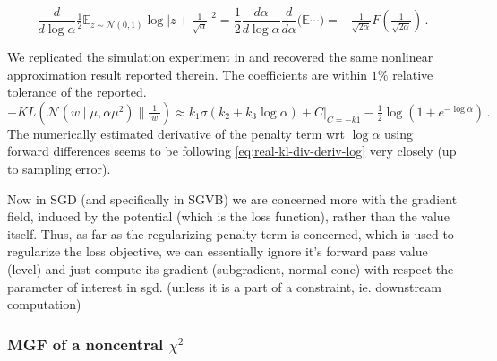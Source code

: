 \documentclass[a4paper,10pt]{article}
\begin{document}
\begin{equation} \label{eq:real-kl-div-deriv-log}
\frac{d}{d\log \alpha}
  \tfrac12 \mathbb{E}_{z \sim \mathcal{N}(0,1)}
  \log \lvert z + \tfrac1{\sqrt{\alpha}} \rvert^2
  = \frac12 \frac{d\alpha}{d\log \alpha}
    \frac{d}{d\alpha} \bigl(\mathbb{E}\cdots \bigr)
  = - \tfrac1{\sqrt{2\alpha}} F(\tfrac1{\sqrt{2\alpha}})
  \,.
\end{equation}

We replicated the simulation experiment in \cite{molchanov_variational_2017} and recovered
the same nonlinear approximation result reported therein. The coefficients are within
$1\%$ relative tolerance of the reported.
$$
- KL(\mathcal{N}(w \mid \mu, \alpha \mu^2) \|
    \tfrac1{\lvert w \rvert})
  \approx
    k_1 \sigma(k_2 + k_3 \log \alpha) + C \big\vert_{C = -k1}
    - \tfrac12 \log (1 + e^{-\log \alpha})
  \,. $$
The numerically estimated derivative of the penalty term wrt $\log \alpha$ using forward
differences seems to be following \eqref{eq:real-kl-div-deriv-log} very closely (up to
sampling error).

Now in SGD (and specifically in SGVB) we are concerned more with the gradient field, induced
by the potential (which is the loss function), rather than the value itself. Thus, as far as
the regularizing penalty term is concerned, which is used to regularize the loss objective,
we can essentially ignore it's forward pass value (level) and just compute its gradient
(subgradient, normal cone) with respect the parameter of interest in sgd. (unless it is a
part of a constraint, ie. downstream computation)


\subsubsection{MGF of a noncentral $\chi^2$} %
\label{ssub:mgf_of_a_noncentral_chi}
\end{document}
